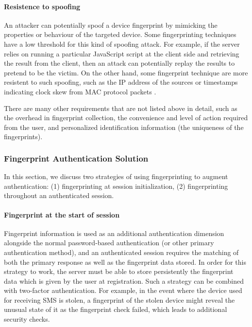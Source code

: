 \documentclass{acm_proc_article-sp}
\begin{document}
\paragraph {Resistence to spoofing}
An attacker can potentially spoof a device fingerprint by mimicking the properties or behaviour of the targeted device. Some fingerprinting techniques  have a low threshold for this kind of spoofing attack. For example, if the server relies on running a particular JavaScript script at the client side and retrieving the result from the client, then an attack can potentially replay the results to pretend to be the victim.
On the other hand, some fingerprint technique are more resistent to such spoofing, such as the IP address of the sources\cite{beverly:ip} or timestamps indicating clock skew from MAC protocol packets \cite{ara:wire}.

There are many other requirements that are not listed above in detail, such as the overhead in fingerprint collection, the convenience and level of action required from the user, and personalized identification information (the uniqueness of the fingerprints).


\subsubsection{Fingerprint Authentication Solution}
In this section, we discuss two strategies of using fingerprinting to augment authentication: (1) fingerprinting at session initialization, (2) fingerprinting throughout an authenticated session. 

\paragraph{Fingerprint at the start of session}
Fingerprint information is used as an additional authentication dimension alongside the normal password-based authentication (or other primary authentication method), and an authenticated session requires the matching of both the primary response as well as the fingerprint data stored.
In order for this strategy to work, the server must be able to store persistently the fingerprint data which is given by the user at registration. 
Such a strategy can be combined with two-factor authentication. For example, in the event where the device used for receiving SMS is stolen, a fingerprint of the stolen device might reveal the unusual state of it as the fingerprint check failed, which leads to additional security checks.
\end{document}
